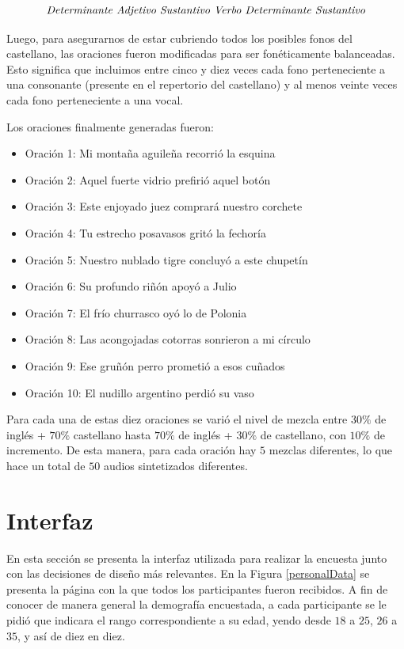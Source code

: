 $$\textnormal{\textit{Determinante Adjetivo Sustantivo Verbo Determinante Sustantivo}}$$

Luego, para asegurarnos de estar cubriendo todos los posibles fonos del castellano, las oraciones fueron modificadas para ser fonéticamente balanceadas. Esto significa que incluimos entre cinco y diez veces cada fono perteneciente a una consonante (presente en el repertorio del castellano) y al menos veinte veces cada fono perteneciente a una vocal.

Los oraciones finalmente generadas fueron:

\begin{itemize}
\item Oración 1: Mi montaña aguileña recorrió la esquina
\item Oración 2: Aquel fuerte vidrio prefirió aquel botón
\item Oración 3: Este enjoyado juez comprará nuestro corchete
\item Oración 4: Tu estrecho posavasos gritó la fechoría
\item Oración 5: Nuestro nublado tigre concluyó a este chupetín
\item Oración 6: Su profundo riñón apoyó a Julio
\item Oración 7: El frío churrasco oyó lo de Polonia
\item Oración 8: Las acongojadas cotorras sonrieron a mi círculo
\item Oración 9: Ese gruñón perro prometió a esos cuñados
\item Oración 10: El nudillo argentino perdió su vaso
\end{itemize}

Para cada una de estas diez oraciones se varió el nivel de mezcla entre $30\%$ de inglés + $70\%$ castellano hasta $70\%$ de inglés + $30\%$ de castellano, con $10\%$ de incremento. De esta manera, para cada oración hay $5$ mezclas diferentes, lo que hace un total de $50$ audios sintetizados diferentes.

\section{Interfaz}\label{interfaz}

En esta sección se presenta la interfaz utilizada para realizar la encuesta junto con las decisiones de diseño más relevantes. En la Figura \ref{personalData} se presenta la página con la que todos los participantes fueron recibidos. A fin de conocer de manera general la demografía encuestada, a cada participante se le pidió que indicara el rango correspondiente a su edad, yendo desde $18$ a $25$, $26$ a $35$, y así de diez en diez.

